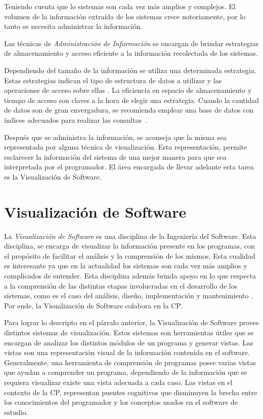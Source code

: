 Teniendo cuenta que lo sistemas son cada vez más amplios y complejos. El volumen de la información extraída de los sistemas crece notoriamente, por lo tanto se necesita administrar la información.

Las técnicas de \textit{Administración de Información} se encargan de brindar estrategias de almacenamiento y acceso eficiente a la información recolectada de los sistemas. 

Dependiendo del tamaño de la información se utiliza una determinada estrategia. Estas estrategias indican el tipo de estructura de datos a utilizar y las operaciones de acceso sobre ellas \cite{AAJU83,TSTA80}. La eficiencia en espacio de almacenamiento y tiempo de acceso son claves a la hora de elegir una estrategia.
Cuando la cantidad de datos son de gran envergadura, se recomienda emplear una base de datos con índices adecuados para realizar las \mbox{consultas \cite{ERNS99}.}

Después que se administra la información, se aconseja que la misma sea representada por alguna técnica de visualización. Esta representación, permite esclarecer la información del sistema de una mejor manera para que sea interpretada por el programador. El área encargada de llevar adelante esta tarea es la Visualización de Software.



\section{Visualización de Software}

La \textit{Visualización de Software} es una disciplina de la Ingeniería del Software. Esta disciplina, se encarga de visualizar la información presente en los programas, con el propósito de facilitar el análisis y la comprensión de los mismos. Esta cualidad es interesante ya que en la actualidad los sistemas son cada vez más amplios y complicados de entender. Esta disciplina además brinda apoyo en lo que respecta a la comprensión de las distintas etapas involucradas en el desarrollo de los sistemas, como es el caso del análisis, diseño, implementación y mantenimiento \cite{MBPHRU10}. Por ende, la Visualización de Software colabora en la CP.

Para lograr lo descripto en el párrafo anterior, la Visualización de Software provee distintos sistemas de visualización. Estos sistemas son herramientas útiles que se encargan de analizar los distintos módulos de un programa y generar vistas. Las vistas son una representación visual de la información contenida en el software. Generalmente, una herramienta de comprensión de programas posee varias vistas que ayudan a comprender un programa, dependiendo de la información que se requiera visualizar existe una vista adecuada a cada caso. Las vistas en el contexto de la CP, representan puentes cognitivos que disminuyen la brecha entre los conocimientos del programador y los conceptos usados en el software de estudio.


